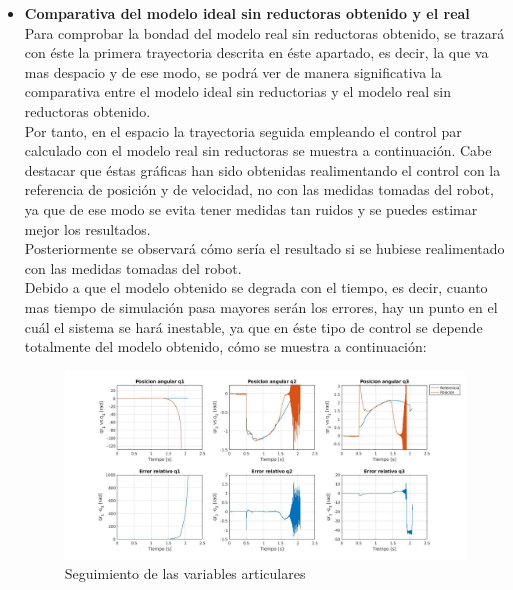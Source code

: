 \begin{itemize}
	\item \textbf{Comparativa del modelo ideal sin reductoras obtenido y el real} \\
Para comprobar la bondad del modelo real sin reductoras obtenido, se trazará con éste la primera trayectoria descrita en éste apartado, es decir, la que va mas despacio y de ese modo, se podrá ver de manera significativa la comparativa entre el modelo ideal sin reductorias y el modelo real sin reductoras obtenido. \\
Por tanto, en el espacio la trayectoria seguida empleando el control par calculado con el modelo real sin reductoras se muestra a continuación. Cabe destacar que éstas gráficas han sido obtenidas realimentando el control con la referencia de posición y de velocidad, no con las medidas tomadas del robot, ya que de ese modo se evita tener medidas tan ruidos y se puedes estimar mejor los resultados.\\
Posteriormente se observará cómo sería el resultado si se hubiese realimentado con las medidas tomadas del robot.\\

Debido a que el modelo obtenido se degrada con el tiempo, es decir, cuanto mas tiempo de simulación pasa mayores serán los errores, hay un punto en el cuál el sistema se hará inestable, ya que en éste tipo de control se depende totalmente del modelo obtenido, cómo se muestra a continuación:

\begin{figure}[h!]
	\centering
	\includegraphics[width=.8\textwidth]{exp4_posPDrealSR}
	\caption{Seguimiento de las variables articulares}
\end{figure}

\end{itemize}
